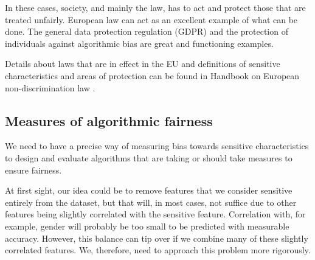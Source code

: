 In these cases, society, and mainly the law, has to act and protect those that are treated unfairly. European law can act as an excellent example of what can be done. The general data protection regulation (GDPR) and the protection of individuals against algorithmic bias are great and functioning examples.

Details about laws that are in effect in the EU and definitions of sensitive characteristics and areas of protection can be found in Handbook on European non-discrimination law \cite{european-union-agency-for-fundamental-rights-2018}.


\subsection{Measures of algorithmic fairness}
We need to have a precise way of measuring bias towards sensitive characteristics to design and evaluate algorithms that are taking or should take measures to ensure fairness. 

At first sight, our idea could be to remove features that we consider sensitive entirely from the dataset, but that will, in most cases, not suffice due to other features being slightly correlated with the sensitive feature. Correlation with, for example, gender will probably be too small to be predicted with measurable accuracy. However, this balance can tip over if we combine many of these slightly correlated features. We, therefore, need to approach this problem more rigorously.

